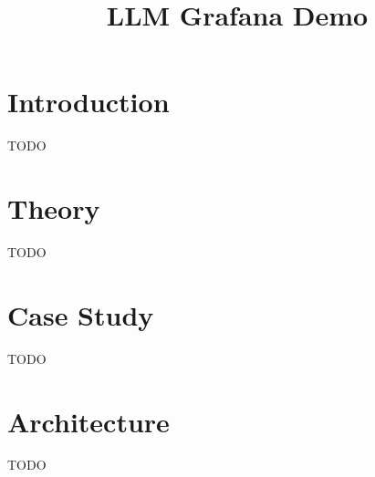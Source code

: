 \documentclass{article}
\title{LLM Grafana Demo}
\begin{document}
\maketitle

\section{Introduction}
TODO

\section{Theory}
TODO

\section{Case Study}
TODO

\section{Architecture}
TODO
\end{document}
